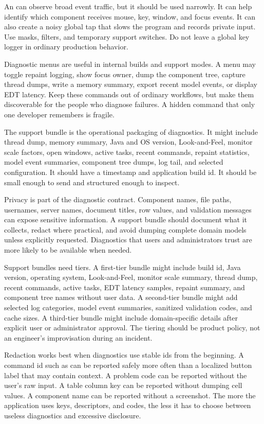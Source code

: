 An  can observe broad event traffic, but it should be used narrowly. It can help identify which component receives mouse, key, window, and focus events. It can also create a noisy global tap that slows the program and records private input. Use masks, filters, and temporary support switches. Do not leave a global key logger in ordinary production behavior.

Diagnostic menus are useful in internal builds and support modes. A menu may toggle repaint logging, show focus owner, dump the component tree, capture thread dumps, write a memory summary, export recent model events, or display EDT latency. Keep these commands out of ordinary workflows, but make them discoverable for the people who diagnose failures. A hidden command that only one developer remembers is fragile.

The support bundle is the operational packaging of diagnostics. It might include thread dump, memory summary, Java and OS version, Look-and-Feel, monitor scale factors, open windows, active tasks, recent commands, repaint statistics, model event summaries, component tree dumps, log tail, and selected configuration. It should have a timestamp and application build id. It should be small enough to send and structured enough to inspect.

Privacy is part of the diagnostic contract. Component names, file paths, usernames, server names, document titles, row values, and validation messages can expose sensitive information. A support bundle should document what it collects, redact where practical, and avoid dumping complete domain models unless explicitly requested. Diagnostics that users and administrators trust are more likely to be available when needed.

Support bundles need tiers. A first-tier bundle might include build id, Java version, operating system, Look-and-Feel, monitor scale summary, thread dump, recent commands, active tasks, EDT latency samples, repaint summary, and component tree names without user data. A second-tier bundle might add selected log categories, model event summaries, sanitized validation codes, and cache sizes. A third-tier bundle might include domain-specific details after explicit user or administrator approval. The tiering should be product policy, not an engineer's improvisation during an incident.

Redaction works best when diagnostics use stable ids from the beginning. A command id such as  can be reported safely more often than a localized button label that may contain context. A problem code can be reported without the user's raw input. A table column key can be reported without dumping cell values. A component name can be reported without a screenshot. The more the application uses keys, descriptors, and codes, the less it has to choose between useless diagnostics and excessive disclosure.

